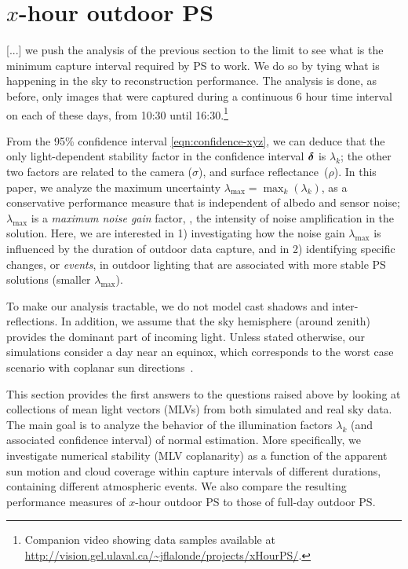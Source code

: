 \section{$x$-hour outdoor PS}
\label{sec:ch1_analysis}


[...] we push the analysis of the previous section to the limit to see what is the minimum capture interval required by PS to work. We do so by tying what is happening in the sky to reconstruction performance. The analysis is done, as before, only images that were captured during a continuous 6 hour time interval on each of these days, from 10:30 until 16:30.\footnote{Companion video showing data samples available at \url{http://vision.gel.ulaval.ca/~jflalonde/projects/xHourPS/}.}

From the 95\% confidence interval \eqref{eqn:confidence-xyz}, we can deduce that the only light-dependent stability factor in the confidence interval $\boldsymbol \delta$ is $\lambda_k$; the other two factors are related to the camera ($\sigma$), and surface reflectance~($\rho$). In this paper, we analyze the maximum uncertainty \mbox{$\lambda_\text{max} = \max_k(\lambda_k)$}, as a conservative performance measure that is independent of albedo and sensor noise; $\lambda_\text{max}$ is a {\em maximum noise gain} factor, \ie, the intensity of noise amplification in the solution. Here, we are interested in 1) investigating how the noise gain $\lambda_\text{max}$ is influenced by the duration of outdoor data capture, and in 2) identifying specific changes, or {\em events}, in outdoor lighting that are associated with more stable PS solutions (smaller $\lambda_\text{max}$).

To make our analysis tractable, we do not model cast shadows and inter-reflections. In addition, we assume that the sky hemisphere (around zenith) provides the dominant part of incoming light. Unless stated otherwise, our simulations consider a day near an equinox, which corresponds to the worst case scenario with coplanar sun directions~\cite{shen-pg-14}.


This section provides the first answers to the questions raised above by looking at collections of mean light vectors (MLVs) from both simulated and real sky data. The main goal is to analyze the behavior of the illumination factors $\lambda_k$ (and associated confidence interval) of normal estimation. More specifically, we investigate numerical stability (MLV coplanarity) as a function of the apparent sun motion and cloud coverage within capture intervals of different durations, containing different atmospheric events. We also compare the resulting performance measures of $x$-hour outdoor PS to those of full-day outdoor PS.

